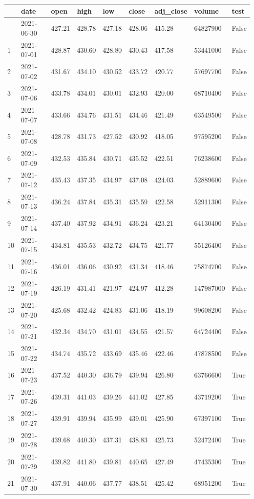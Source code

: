 \documentclass[
  letterpaper,
  DIV=11,
  numbers=noendperiod]{scrreprt}
\begin{document}
\begin{longtable}[]{@{}lllllllll@{}}
\toprule\noalign{}
& date & open & high & low & close & adj\_close & volume & test \\
\midrule\noalign{}
\endhead
\bottomrule\noalign{}
\endlastfoot
0 & 2021-06-30 & 427.21 & 428.78 & 427.18 & 428.06 & 415.28 & 64827900 &
False \\
1 & 2021-07-01 & 428.87 & 430.60 & 428.80 & 430.43 & 417.58 & 53441000 &
False \\
2 & 2021-07-02 & 431.67 & 434.10 & 430.52 & 433.72 & 420.77 & 57697700 &
False \\
3 & 2021-07-06 & 433.78 & 434.01 & 430.01 & 432.93 & 420.00 & 68710400 &
False \\
4 & 2021-07-07 & 433.66 & 434.76 & 431.51 & 434.46 & 421.49 & 63549500 &
False \\
5 & 2021-07-08 & 428.78 & 431.73 & 427.52 & 430.92 & 418.05 & 97595200 &
False \\
6 & 2021-07-09 & 432.53 & 435.84 & 430.71 & 435.52 & 422.51 & 76238600 &
False \\
7 & 2021-07-12 & 435.43 & 437.35 & 434.97 & 437.08 & 424.03 & 52889600 &
False \\
8 & 2021-07-13 & 436.24 & 437.84 & 435.31 & 435.59 & 422.58 & 52911300 &
False \\
9 & 2021-07-14 & 437.40 & 437.92 & 434.91 & 436.24 & 423.21 & 64130400 &
False \\
10 & 2021-07-15 & 434.81 & 435.53 & 432.72 & 434.75 & 421.77 & 55126400
& False \\
11 & 2021-07-16 & 436.01 & 436.06 & 430.92 & 431.34 & 418.46 & 75874700
& False \\
12 & 2021-07-19 & 426.19 & 431.41 & 421.97 & 424.97 & 412.28 & 147987000
& False \\
13 & 2021-07-20 & 425.68 & 432.42 & 424.83 & 431.06 & 418.19 & 99608200
& False \\
14 & 2021-07-21 & 432.34 & 434.70 & 431.01 & 434.55 & 421.57 & 64724400
& False \\
15 & 2021-07-22 & 434.74 & 435.72 & 433.69 & 435.46 & 422.46 & 47878500
& False \\
16 & 2021-07-23 & 437.52 & 440.30 & 436.79 & 439.94 & 426.80 & 63766600
& True \\
17 & 2021-07-26 & 439.31 & 441.03 & 439.26 & 441.02 & 427.85 & 43719200
& True \\
18 & 2021-07-27 & 439.91 & 439.94 & 435.99 & 439.01 & 425.90 & 67397100
& True \\
19 & 2021-07-28 & 439.68 & 440.30 & 437.31 & 438.83 & 425.73 & 52472400
& True \\
20 & 2021-07-29 & 439.82 & 441.80 & 439.81 & 440.65 & 427.49 & 47435300
& True \\
21 & 2021-07-30 & 437.91 & 440.06 & 437.77 & 438.51 & 425.42 & 68951200
& True \\
\end{longtable}
\end{document}

